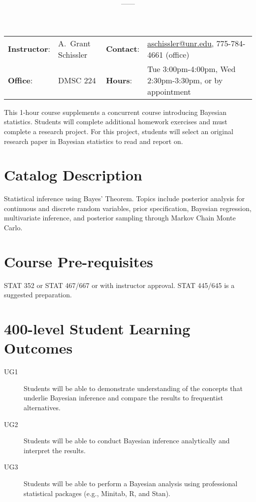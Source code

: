 \documentclass[11pt,onecolumn]{article}
\title{\textbf{\coursename}}
\author{{\semester}---{\roomnumb}---{\classtimes}}
\date{}
\makeatletter
\newcommand{\myname}{A.~Grant Schissler}
\newcommand{\myemail}{aschissler@unr.edu}
\newcommand{\office}{DMSC 224}
\newcommand{\officehours}{Tue 3:00pm-4:00pm, Wed 2:30pm-3:30pm, or by appointment}
\makeatother
\begin{document}
\maketitle

\vspace{-0.25in}
\noindent\makebox[\linewidth]{\rule{\textwidth}{1pt}}

\begin{center}
\begin{tabular}{llll}
\textbf{Instructor}:&\myname & \textbf{Contact}:&\href{mailto:\myemail}{\myemail}, 775-784-4661 (office)\\
\textbf{Office}:&\office & \textbf{Hours}:&\officehours\\
\end{tabular}
\end{center}

This 1-hour course supplements a concurrent course introducing Bayesian statistics. Students will complete additional homework exercises and must complete a research project. For this project, students will select an original research paper in Bayesian statistics to read and report on.

\section*{Catalog Description}
Statistical inference using Bayes' Theorem. Topics include posterior analysis for continuous and discrete random variables, prior specification, Bayesian regression, multivariate inference, and posterior sampling through Markov Chain Monte Carlo.

\section*{Course Pre-requisites}
STAT 352 or STAT 467/667 or with instructor approval. STAT 445/645 is a suggested preparation.

\section*{400-level Student Learning Outcomes}
\begin{description}
\item[UG1] Students will be able to demonstrate understanding of the concepts that underlie Bayesian inference and compare the results to frequentist alternatives.
\item[UG2] Students will be able to conduct Bayesian inference analytically and interpret the results.
\item[UG3] Students will be able to perform a Bayesian analysis using professional statistical packages (e.g., \textsf{Minitab}, \textsf{R}, and \textsf{Stan}).
\end{description}
\end{document}
